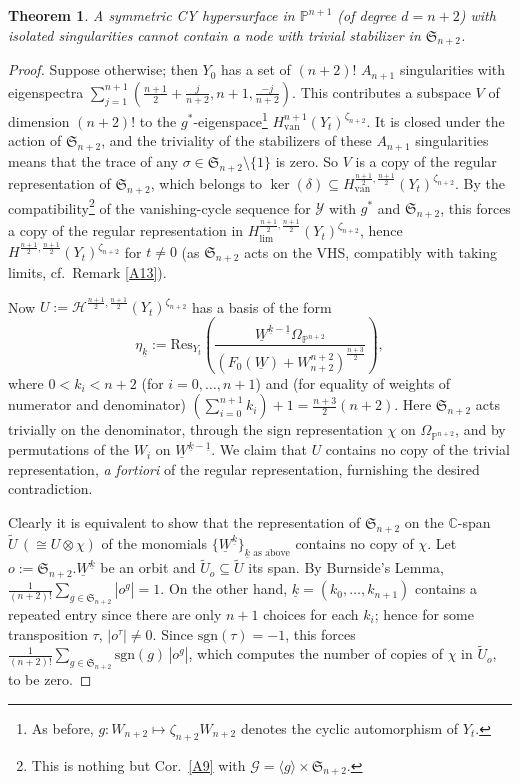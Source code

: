 \documentclass[12pt,letterpaper,english]{amsart}
\numberwithin{equation}{section}
\numberwithin{figure}{section}
\theoremstyle{plain}
\newtheorem{thm}[equation]{Theorem}
\theoremstyle{remark}
\theoremstyle{definition}
\theoremstyle{definition}
\theoremstyle{plain}
\theoremstyle{plain}
\theoremstyle{plain}
\theoremstyle{plain}
\theoremstyle{definition}
\def\CC{\mathbb{C}}
\def\PP{\mathbb{P}}
\def\Y{\mathcal{Y}}
\def\Y{\mathcal{Y}}
\def\H{\mathcal{H}}
\def\van{\mathrm{van}}
\def\sm{\setminus}
\def\UW{\underline{W}}
\theoremstyle{definition}
\begin{document}
\begin{thm}\label{C9}
A symmetric CY hypersurface in $\PP^{n+1}$ \textup{(}of degree $d=n+2$\textup{)} with isolated singularities cannot contain a node with trivial stabilizer	in $\mathfrak{S}_{n+2}$.
\end{thm}
\begin{proof}
Suppose otherwise; then $Y_0$ has a set of $(n+2)!$ $A_{n+1}$ singularities with eigenspectra $\sum_{j=1}^{n+1}(\tfrac{n+1}{2}+\tfrac{j}{n+2},n+1,\tfrac{-j}{n+2})$. This contributes a subspace $V$ of dimension $(n+2)!$ to the $g^*$-eigenspace\footnote{As before, $g\colon W_{n+2}\mapsto \zeta_{n+2}W_{n+2}$ denotes the cyclic automorphism of $Y_t$.} $H^{n+1}_{\van}(Y_t)^{\zeta_{n+2}}$. It is closed under the action of $\mathfrak{S}_{n+2}$, and the triviality of the stabilizers of these $A_{n+1}$ singularities means that the trace of any $\sigma\in \mathfrak{S}_{n+2}\sm\{1\}$ is zero. So $V$ is a copy of the regular representation of $\mathfrak{S}_{n+2}$, which belongs to $\ker(\delta)\subseteq H^{\frac{n+1}{2},\frac{n+1}{2}}_{\van}(Y_t)^{\zeta_{n+2}}$. By the compatibility\footnote{This is nothing but Cor.~\ref{A9} with $\mathcal{G}=\langle g\rangle \times \mathfrak{S}_{n+2}$.} of the vanishing-cycle sequence for $\Y$ with $g^*$ and $\mathfrak{S}_{n+2}$, this forces a copy of the regular representation in $H_{\lim}^{\frac{n+1}{2},\frac{n+1}{2}}(Y_t)^{\zeta_{n+2}}$, hence $H^{\frac{n+1}{2},\frac{n+1}{2}}(Y_t)^{\zeta_{n+2}}$ for $t\neq 0$ (as $\mathfrak{S}_{n+2}$ acts on the VHS, compatibly with taking limits, cf.~Remark \ref{A13}).

Now $U:=\H^{\frac{n+1}{2},\frac{n+1}{2}}(Y_t)^{\zeta_{n+2}}$ has a basis of the form $$\eta_{\underline{k}}:=\mathrm{Res}_{Y_t}\left(\frac{\UW^{\underline{k}-\underline{1}}\Omega_{\PP^{n+2}}}{(F_0(\UW)+W^{n+2}_{n+2})^{\frac{n+3}{2}}}\right),$$
where $0<k_i<n+2$ (for $i=0,\ldots,n+1$) and (for equality of weights of numerator and denominator) $(\sum_{i=0}^{n+1}k_i)+1=\tfrac{n+3}{2}(n+2)$. Here $\mathfrak{S}_{n+2}$ acts trivially on the denominator, through the sign representation $\chi$ on $\Omega_{\PP^{n+2}}$, and by permutations of the $W_i$ on $\UW^{\underline{k}-\underline{1}}$. We claim that $U$ contains no copy of the trivial representation, \emph{a fortiori} of the regular representation, furnishing the desired contradiction.

Clearly it is equivalent to show that the representation of $\mathfrak{S}_{n+2}$ on the $\CC$-span $\widetilde{U}\,(\cong U\otimes \chi)$ of the monomials $\{\UW^{\underline{k}}\}_{\underline{k}\text{ as above}}$ contains no copy of $\chi$. Let $o:=\mathfrak{S}_{n+2}.\UW^{\underline{k}}$ be an orbit and $\widetilde{U}_{o}\subseteq \widetilde{U}$ its span. By Burnside's Lemma, $\tfrac{1}{(n+2)!}\sum_{g\in \mathfrak{S}_{n+2}}|o^g|=1$. On the other hand, $\underline{k}=(k_0,\ldots,k_{n+1})$ contains a repeated entry since there are only $n+1$ choices for each $k_i$; hence for some transposition $\tau$, $|o^{\tau}|\neq 0$. Since $\mathrm{sgn}(\tau)=-1$, this forces $\tfrac{1}{(n+2)!}\sum_{g\in \mathfrak{S}_{n+2}}\mathrm{sgn}(g)\,|o^g|$, which computes the number of copies of $\chi$ in $\widetilde{U}_o$, to be zero.
\end{proof}
\end{document}
